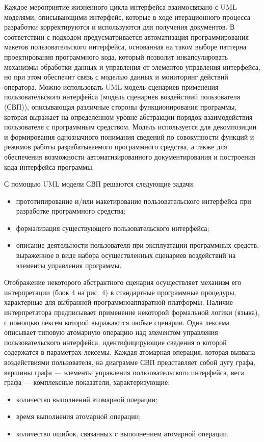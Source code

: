 	Каждое мероприятие жизненного цикла интерфейса взаимосвязано с UML моделями, описывающими интерфейс, которые в ходе итерационного процесса разработки корректируются и используются для получения документов.
	В соответствии с подходом предусматривается автоматизация программирования макетов пользовательского интерфейса, основанная на таком выборе паттерна проектирования программного кода, который позволит инкапсулировать механизмы обработки данных и управления от элементов управления интерфейса, но при этом обеспечит связь с моделью данных и мониторинг действий оператора.
	Можно использовать UML модель сценариев применения пользовательского интерфейса (модель сценариев воздействий пользователя (СВП)), описывающая различные стороны функционирования программы, которая выражает на определенном уровне абстракции порядок взаимодействия пользователя с программным средством. Модель используется для декомпозиции и формирования однозначного понимания сведений по совокупности функций и режимов работы разрабатываемого программного средства, а также для обеспечения возможности автоматизированного документирования и построения кода интерфейса программы.

	С помощью UML модели СВП решаются следующие задачи: 
\begin{itemize}
	\item прототипирование и/или макетирование пользовательского интерфейса при разработке программного средства;
	\item формализация существующего пользовательского интерфейса;
	\item описание деятельности пользователя при эксплуатации программных средств, выраженное в виде набора осуществленных сценариев воздействий на элементы управления программы.
\end{itemize}

	Отображение некоторого абстрактного сценария осуществляет механизм его интерпретации (блок 4 на рис. 4) в стандартные программные процедуры, характерные для выбранной программноаппаратной платформы. Наличие интерпретатора предписывает применение некоторой формальной логики (языка), с помощью лексем которой выражаются любые сценарии. Одна лексема описывает типовую атомарную операцию над элементом управления пользовательского интерфейса, идентифицирующие сведения о которой содержатся в параметрах лексемы.
	Каждая атомарная операция, которая вызвана воздействиями пользователя, на диаграмме СВП представляет собой дугу графа, вершины графа — элементы управления пользовательского интерфейса, веса графа — комплексные показатели, характеризующие:
\begin{itemize}
	\item количество выполнений атомарной операции; 
	\item время выполнения атомарной операции;
	\item количество ошибок, связанных с выполнением атомарной операции.
\end{itemize}
\noteattributes{}

